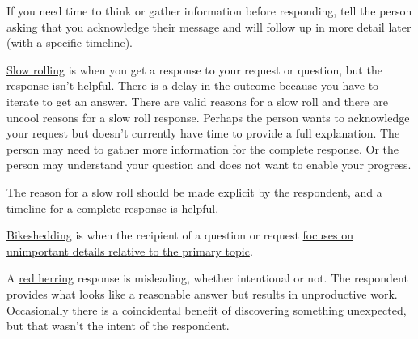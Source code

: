 If you need time to think or gather information before responding,  tell the person asking that you acknowledge their message and will follow up in more detail later (with a specific timeline). 

\underline{Slow rolling} is when you get a response to your request or question, but the response isn't helpful. There is a delay in the outcome because you have to iterate to get an answer. There are valid reasons for a slow roll and there are uncool reasons for a slow roll response. Perhaps the person wants to acknowledge your request but doesn't currently have time to provide a full explanation. The person may need to gather more information for the complete response. Or the person may understand your question and does not want to enable your progress. 

The reason for a slow roll should be made explicit by the respondent, and a timeline for a complete response is helpful. 

\underline{Bikeshedding} is when the recipient of a question or request \href{https://en.wikipedia.org/wiki/Law_of_triviality}{focuses on unimportant details relative to the primary topic}. 

A \underline{red herring} response is misleading, whether intentional or not. The respondent provides what looks like a reasonable answer but results in unproductive work. Occasionally there is a coincidental benefit of discovering something unexpected, but that wasn't the intent of the respondent. 


